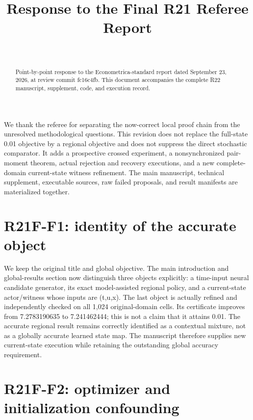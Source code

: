 \documentclass[ecta]{econsocart}
\theoremstyle{remark}
\begin{document}
\begin{frontmatter}
\title{Response to the Final R21 Referee Report}
\begin{aug}\author[id=au1,addressref={add1}]{~}\address[id=add1]{}\end{aug}
\begin{abstract}Point-by-point response to the Econometrica-standard report dated September 23, 2026, at review commit fc16c4fb. This document accompanies the complete R22 manuscript, supplement, code, and execution record.\end{abstract}
\end{frontmatter}
We thank the referee for separating the now-correct local proof chain from the unresolved methodological questions. This revision does not replace the full-state 0.01 objective by a regional objective and does not suppress the direct stochastic comparator. It adds a prospective crossed experiment, a nonsynchronized pair-moment theorem, actual rejection and recovery executions, and a new complete-domain current-state witness refinement. The main manuscript, technical supplement, executable sources, raw failed proposals, and result manifests are materialized together.

\section{R21F-F1: identity of the accurate object}

We keep the original title and global objective. The main introduction and global-results section now distinguish three objects explicitly: a time-input neural candidate generator, its exact model-assisted regional policy, and a current-state actor/witness whose inputs are (t,u,x). The last object is actually refined and independently checked on all 1,024 original-domain cells. Its certificate improves from 7.2783190635 to 7.241462444; this is not a claim that it attains 0.01. The accurate regional result remains correctly identified as a contextual mixture, not as a globally accurate learned state map. The manuscript therefore supplies new current-state execution while retaining the outstanding global accuracy requirement.

\section{R21F-F2: optimizer and initialization confounding}
\end{document}
